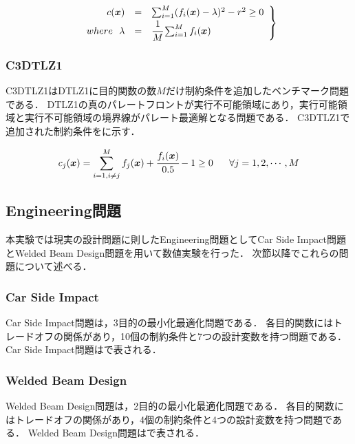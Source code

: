 \documentclass[../main/main]{subfiles}
\begin{document}
\begin{eqnarray}
\left.
\begin{array}{rcl}
c(\bm{x}) &=& \sum^M_{i=1} (f_i(\bm{x}) - \lambda)^2 - r^2 \geq 0\\
where \ \ \lambda &=& \cfrac{1}{M} \sum^M_{i=1} f_i(\bm{x})\\
\end{array}
\right\}
\label{c2dtlz2_const}
\end{eqnarray}

\subsubsection{C3DTLZ1}
C3DTLZ1はDTLZ1に目的関数の数$M$だけ制約条件を追加したベンチマーク問題である．
DTLZ1の真のパレートフロントが実行不可能領域にあり，実行可能領域と実行不可能領域の境界線がパレート最適解となる問題である．
C3DTLZ1で追加された制約条件をに示す．

\begin{equation}
c_j(\bm{x}) = \sum^M_{i = 1, i \neq j} f_j(\bm{x}) + \cfrac{f_i(\bm x)}{0.5} - 1 \geq 0 \ \ \ \ \ \forall j = 1, 2, \cdots, M
\end{equation}

\newpage

\subsection{Engineering問題}
本実験では現実の設計問題に則したEngineering問題としてCar Side Impact問題\cite{}とWelded Beam Design問題\cite{}を用いて数値実験を行った．
次節以降でこれらの問題について述べる．

\subsubsection{Car Side Impact}
Car Side Impact問題\cite{}は，3目的の最小化最適化問題である．
各目的関数にはトレードオフの関係があり，10個の制約条件と7つの設計変数を持つ問題である．
Car Side Impact問題はで表される．

\subsubsection{Welded Beam Design}
Welded Beam Design\cite{}問題は，2目的の最小化最適化問題である．
各目的関数にはトレードオフの関係があり，4個の制約条件と4つの設計変数を持つ問題である．
Welded Beam Design問題はで表される．
\end{document}
